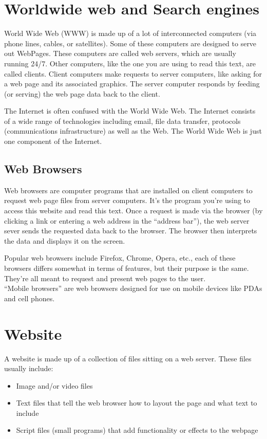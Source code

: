 \documentclass[11pt,a4paper,twoside]{article}
\begin{document}
\section{Worldwide web and Search engines}
 World Wide Web (WWW) is made up of a lot of interconnected computers (via phone lines, cables, or satellites). Some of these computers are designed to serve out WebPages. These computers are called web servers, which are usually running 24/7. Other computers, like the one you are using to read this text, are called clients. Client computers make requests to server computers, like asking for a web page and its associated graphics. The server computer responds by feeding (or serving) the web page data back to the client.\par
The Internet is often confused with the World Wide Web. The Internet consists of a wide range of technologies including email, file data transfer, protocols (communications infrastructure) as well as the Web. The World Wide Web is just one component of the Internet.
\subsection{Web Browsers}
Web browsers are computer programs that are installed on client computers to request web page files from server computers. It’s the program you’re using to access this website and read this text. Once a request is made via the browser (by clicking a link or entering a web address in the “address bar”), the web server sever sends the requested data back to the browser. The browser then interprets the data and displays it on the screen.\par
Popular web browsers include Firefox, Chrome, Opera, etc., each of these browsers differs somewhat in terms of features, but their purpose is the same. They’re all meant to request and present web pages to the user.\\
“Mobile browsers” are web browsers designed for use on mobile devices like PDAs and cell phones.
\section{Website}
A website is made up of a collection of files sitting on a web server. These files usually include:
\begin{itemize}
\item Image and/or video files
\item Text files that tell the web browser how to layout the page and what text to include
\item Script files (small programs) that add functionality or effects to the webpage
\end{itemize}
\end{document}
